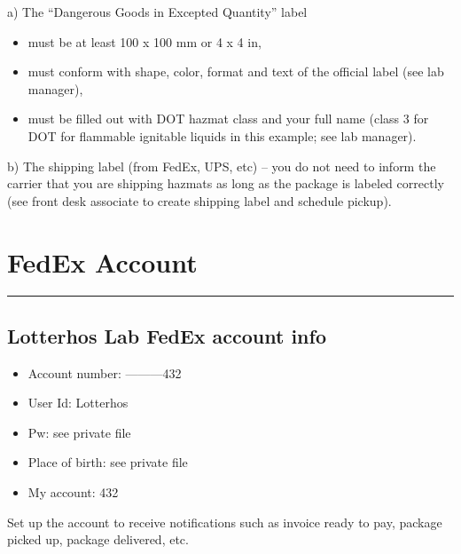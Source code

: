 \documentclass[
  letterpaper,
  DIV=11,
  numbers=noendperiod]{scrreprt}
\begin{document}
a) The ``Dangerous Goods in Excepted Quantity'' label

\begin{itemize}
\item
  must be at least 100 x 100 mm or 4 x 4 in,
\item
  must conform with shape, color, format and text of the official label
  (see lab manager),
\item
  must be filled out with DOT hazmat class and your full name (class 3
  for DOT for flammable ignitable liquids in this example; see lab
  manager).
\end{itemize}

b) The shipping label (from FedEx, UPS, etc) -- you do not need to
inform the carrier that you are shipping hazmats as long as the package
is labeled correctly (see front desk associate to create shipping label
and schedule pickup).

\hypertarget{fedex-account}{%
\chapter{FedEx Account}\label{fedex-account}}

\begin{center}\rule{0.5\linewidth}{0.5pt}\end{center}

\hypertarget{lotterhos-lab-fedex-account-info}{%
\section*{\texorpdfstring{\textbf{Lotterhos Lab FedEx account
info}}{Lotterhos Lab FedEx account info}}\label{lotterhos-lab-fedex-account-info}}


\begin{itemize}
\item
  Account number: ---------432
\item
  User Id: Lotterhos
\item
  Pw: see private file
\item
  Place of birth: see private file
\item
  My account: 432
\end{itemize}

Set up the account to receive notifications such as invoice ready to
pay, package picked up, package delivered, etc.
\end{document}
